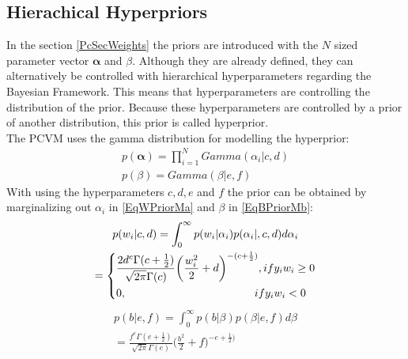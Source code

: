 \subsection{Hierachical Hyperpriors}\label{PcSubSecHierHyper}
In the section \ref{PcSecWeights} the priors are introduced with the $N$ sized parameter vector $\boldsymbol{\alpha }$ and $\beta$.
Although they are already defined, they can alternatively be controlled with hierarchical hyperparameters regarding the Bayesian Framework.
This means that hyperparameters are controlling the distribution of the prior. \cite[p. 71]{Bishop.2009}
Because these hyperparameters are controlled by a prior of another distribution, this prior is called hyperprior.\cite[.p 423]{Bishop.1995}\\
The \acs{PCVM} uses the gamma distribution for modelling the hyperprior:\cite{Chen.2009}
\begin{equation}\label{EqPcvmHyperParameter}
\begin{gathered}
		p(\boldsymbol{\alpha}) = \prod_{i=1}^{N}Gamma(\alpha_i \vert c,d)\\
		p(\beta) = Gamma(\beta\vert e,f)
\end{gathered}
\end{equation}	
With using the hyperparameters $c,d,e$ and $f$ the prior can be obtained by marginalizing out $\alpha_i$ in \ref{EqWPriorMa} and $\beta$ in \ref{EqBPriorMb}:\cite{Chen.2009}
\begin{equation}\label{EqWPriorMa}
	\begin{gathered}
		p(w_i \vert c,d) = \int_{0}^{\infty} p(w_i \vert \alpha_i)p(\alpha_i\vert ,c,d)d\alpha_i \\ 
		=\begin{dcases}
				\frac{2d^c\Gamma(c+\frac{1}{2})}{\sqrt{2\pi}\Gamma(c)}\bigg(\frac{w_i^2}{2}+d \bigg)^{-(c+\frac{1}{2})}, if y_iw_i \ge 0\\ 
				0, \>\>\>\>\>\>\>\>\>\>\>\>\>\>\>\>\>\>\>\>\>\>\>\>\>\>\>\>\>\>\>\>\>\>\>\>\>\>\>\>\>\>\>\>\>\>\>\>\>\>\>\> if y_i w_i<0
		\end{dcases}
	\end{gathered}
\end{equation}
\begin{equation}\label{EqBPriorMb}
	\begin{gathered}
		p(b\vert e,f) = \int_{0}^{\infty} p(b \vert \beta) p(\beta \vert e,f)d\beta \\
		=\frac{f^e\Gamma(e + \frac{1}{2})}{\sqrt{2\pi}\Gamma(e)}\bigg( \frac{b^2}{2}+f\bigg)^{-e+\frac{1}{2})}
	\end{gathered}
\end{equation}
